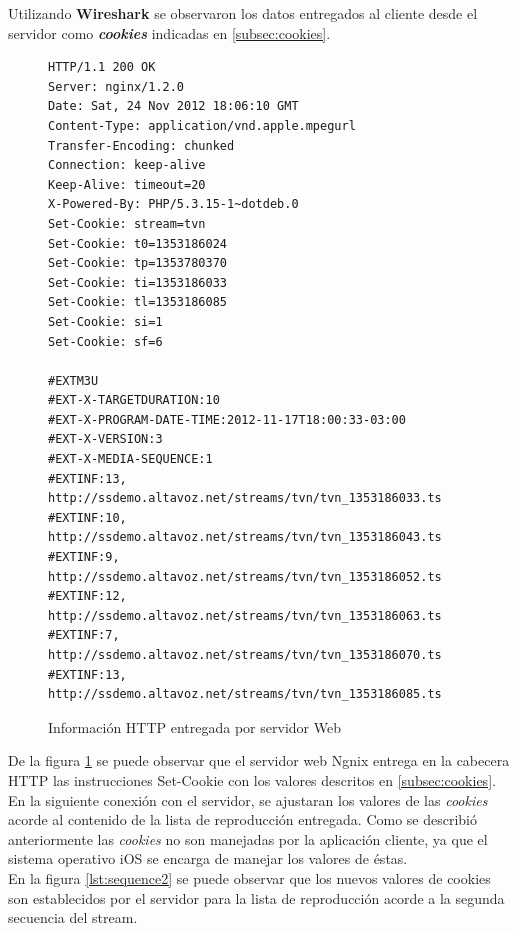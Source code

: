 Utilizando \textbf{Wireshark} se observaron los datos entregados al cliente desde el servidor como \textit{\textbf{cookies}} indicadas en \ref{subsec:cookies}.

\begin{figure}[H]
	\centering
\begin{lstlisting}
HTTP/1.1 200 OK
Server: nginx/1.2.0
Date: Sat, 24 Nov 2012 18:06:10 GMT
Content-Type: application/vnd.apple.mpegurl
Transfer-Encoding: chunked
Connection: keep-alive
Keep-Alive: timeout=20
X-Powered-By: PHP/5.3.15-1~dotdeb.0
Set-Cookie: stream=tvn
Set-Cookie: t0=1353186024
Set-Cookie: tp=1353780370
Set-Cookie: ti=1353186033
Set-Cookie: tl=1353186085
Set-Cookie: si=1
Set-Cookie: sf=6

#EXTM3U
#EXT-X-TARGETDURATION:10
#EXT-X-PROGRAM-DATE-TIME:2012-11-17T18:00:33-03:00
#EXT-X-VERSION:3
#EXT-X-MEDIA-SEQUENCE:1
#EXTINF:13,
http://ssdemo.altavoz.net/streams/tvn/tvn_1353186033.ts
#EXTINF:10,
http://ssdemo.altavoz.net/streams/tvn/tvn_1353186043.ts
#EXTINF:9,
http://ssdemo.altavoz.net/streams/tvn/tvn_1353186052.ts
#EXTINF:12,
http://ssdemo.altavoz.net/streams/tvn/tvn_1353186063.ts
#EXTINF:7,
http://ssdemo.altavoz.net/streams/tvn/tvn_1353186070.ts
#EXTINF:13,
http://ssdemo.altavoz.net/streams/tvn/tvn_1353186085.ts
\end{lstlisting}
\caption{Información HTTP entregada por servidor Web}
\label{lst:setcookies}
\end{figure}

De la figura \ref{lst:setcookies} se puede observar que el servidor web Ngnix\cite{bib:ngnix-homepage} entrega en la cabecera HTTP las instrucciones Set-Cookie con los valores descritos en \ref{subsec:cookies}. \\

En la siguiente conexión con el servidor, se ajustaran los valores de las \textit{cookies} acorde al contenido de la lista de reproducción entregada. Como se describió anteriormente las \textit{cookies} no son manejadas por la aplicación cliente, ya que el sistema operativo iOS se encarga de manejar los valores de éstas.\\

En la figura \ref{lst:sequence2} se puede observar que los nuevos valores de cookies son establecidos por el servidor para la lista de reproducción acorde a la segunda secuencia del stream.

